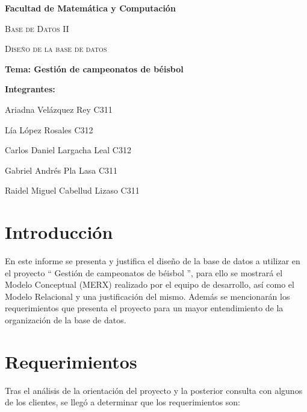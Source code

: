 \documentclass{report}
\begin{document}
    \begin{titlepage}
        \centering
        {\bfseries\LARGE Facultad de Matemática y Computación \par}
        \vspace*{1cm}
        {\scshape\Large Base de Datos II \par}
        \vspace*{3cm}
        {\scshape\Huge Diseño de la base de datos \par}
        \vspace*{1cm}
        {\LARGE \textbf{Tema: Gestión de campeonatos de béisbol} }
        \vfill
        {\bfseries\LARGE Integrantes: \par}
        {\Large Ariadna Vel\'azquez Rey  C311 \par} 
        {\Large L\'ia L\'opez Rosales  C312 \par} 
        {\Large Carlos Daniel Largacha Leal  C312 \par} 
        {\Large Gabriel Andr\'es Pla Lasa  C311 \par} 
        {\Large Raidel Miguel Cabellud Lizaso C311 \par} 
        \vfill
    \end{titlepage}


    \section*{Introducción}

    En este informe se presenta y justifica el diseño de la base de datos a utilizar en el proyecto `` Gestión de 
    campeonatos de béisbol '', para ello se mostrará el Modelo Conceptual (MERX) realizado por el equipo de 
    desarrollo, así como el Modelo Relacional y una justificación del mismo. Además se mencionarán los 
    requerimientos que presenta el proyecto para un mayor entendimiento de la organización de la base de datos.

    \section*{Requerimientos}
    Tras el análisis de la orientación del proyecto y la posterior consulta con algunos de los clientes, se llegó
    a determinar que los requerimientos son:
\end{document}
